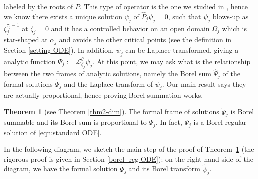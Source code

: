 \documentclass{article}
\theoremstyle{definition}
\newcommand{\series}[1]{\tilde{#1}}
\newcommand{\laplace}{\mathcal{L}}
\newcommand{\borel}{\mathcal{B}}
\newtheorem{theorem}{Theorem}[section]
\begin{document}
labeled by the roots of $P$. This type of operator is the one we studied in \cite{reg-sing-volterra}, hence we know there exists a unique solution $\psi_j$ of $\hat{P}_j\psi_j=0$, such that $\psi_j$ blows-up as $\zeta_j^{\tau_j-1}$ at $\zeta_j=0$ and it has a controlled behavior on an open domain $\Omega_j$ which is star-shaped at $\alpha_j$ and avoids the other critical points (see the definition in Section \ref{setting-ODE}). In addition, $\psi_j$ can be Laplace transformed, giving a analytic function $\Psi_j:=\laplace_{\zeta_j}^{\theta}\psi_j$. 
At this point, we may ask what is the relationship between the two frames of analytic solutions, namely the Borel sum $\hat{\Psi}_j$ of the formal solutions $\series{\Psi}_j$ and the Laplace transform of $\psi_j$. Our main result says they are actually proportional, hence proving Borel summation works. 
\begin{theorem}[see Theorem \ref{thm2-dim}]\label{thm2}
The formal frame of solutions $\tilde{\Psi}_j$ is Borel summable and its Borel sum is proportional to $\Psi_j$. In fact, $\Psi_j$ is a Borel regular solution of \eqref{eqn:standard ODE}.  
\end{theorem}
In the following diagram, we sketch the main step of the proof of Theorem~\ref{thm2} (the rigorous proof is given in Section \ref{borel_reg-ODE}): on the right-hand side of the diagram, we have the formal solution $\series{\Psi }_j$ and its Borel transform $\series{\psi}_j$. %

\begin{center}
\end{center} 
\end{document}
